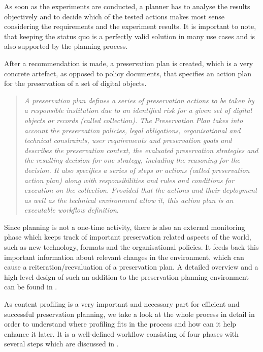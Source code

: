 As soon as the experiments are conducted, a planner has to analyse the results objectively and to decide which of the tested actions makes most sense considering the requirements and the experiment results. It is important to note, that
keeping the status quo is a perfectly valid solution in many use cases and is also supported by the planning process.

After a recommendation is made, a preservation plan is created, which is a very concrete artefact, as opposed to policy documents, that specifies an action plan for the preservation of a set of digital objects.

\begin{quote}
\textit{A preservation plan defines a series of preservation actions to be taken by a responsible institution due to an identified risk for a given set of digital objects or records (called collection). The Preservation Plan takes into account the preservation policies, legal obligations, organisational and technical constraints, user requirements and preservation goals and describes the preservation context, the evaluated preservation strategies and the resulting decision for one strategy, including the reasoning for the decision. It also specifies a series of steps or actions (called preservation action plan) along with responsibilities and rules and conditions for execution on the collection. Provided that the actions and their deployment as well as the technical environment allow it, this action plan is an executable workflow definition}\cite{Becker:2009fk}.
\end{quote}

Since planning is not a one-time activity, there is also an external monitoring phase which keeps track of important preservation related aspects of the world, such as new technology, formats and the organisational policies. It feeds back this important information about relevant changes in the environment, which can cause a reiteration/reevaluation of a preservation plan. A detailed overview and a high level design of such an addition to the preservation planning environment can be found in \cite{duretec:2012:watch}.

As content profiling is a very important and necessary part for efficient and successful preservation planning, we take a look at the whole process in detail in order to understand where profiling fits in the process and how can it help enhance it later. It is a well-defined workflow consisting of four phases with several steps which are discussed in \cite{STR07_jcdl}.


